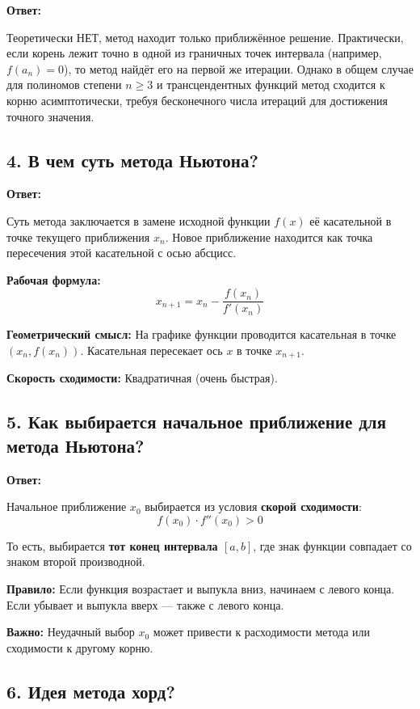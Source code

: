 \documentclass[a4paper,12pt]{article}
\begin{document}
\textbf{Ответ:} 

Теоретически НЕТ, метод находит только приближённое решение. Практически, если корень лежит точно в одной из граничных точек интервала (например, $f(a_n) = 0$), то метод найдёт его на первой же итерации. Однако в общем случае для полиномов степени $n \geq 3$ и трансцендентных функций метод сходится к корню асимптотически, требуя бесконечного числа итераций для достижения точного значения.

\subsection*{4. В чем суть метода Ньютона?}

\textbf{Ответ:} 

Суть метода заключается в замене исходной функции $f(x)$ её касательной в точке текущего приближения $x_n$. Новое приближение находится как точка пересечения этой касательной с осью абсцисс.

\textbf{Рабочая формула:}
\[
    x_{n+1} = x_n - \frac{f(x_n)}{f'(x_n)}
\]

\textbf{Геометрический смысл:} На графике функции проводится касательная в точке $(x_n, f(x_n))$. Касательная пересекает ось $x$ в точке $x_{n+1}$.

\textbf{Скорость сходимости:} Квадратичная (очень быстрая).

\subsection*{5. Как выбирается начальное приближение для метода Ньютона?}

\textbf{Ответ:} 

Начальное приближение $x_0$ выбирается из условия \textbf{скорой сходимости}:
\[
    f(x_0) \cdot f''(x_0) > 0
\]

То есть, выбирается \textbf{тот конец интервала $[a, b]$}, где знак функции совпадает со знаком второй производной.

\textbf{Правило:} Если функция возрастает и выпукла вниз, начинаем с левого конца. Если убывает и выпукла вверх --- также с левого конца.

\textbf{Важно:} Неудачный выбор $x_0$ может привести к расходимости метода или сходимости к другому корню.

\subsection*{6. Идея метода хорд?}
\end{document}

